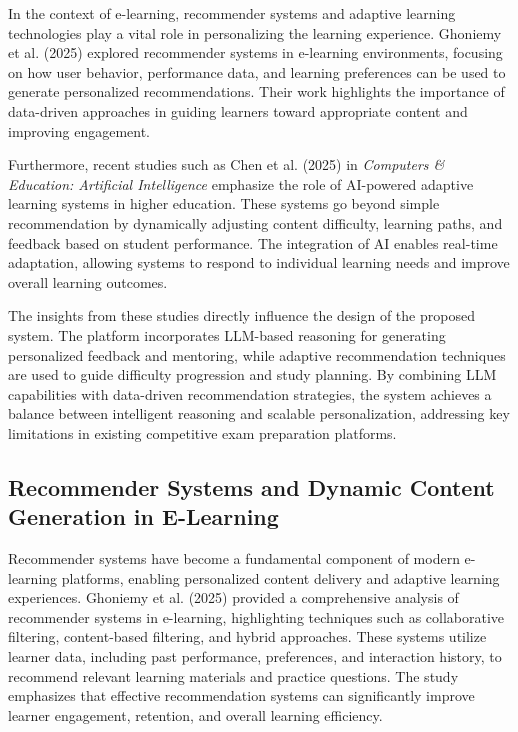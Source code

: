 \begin{sloppypar}
In the context of e-learning, recommender systems and adaptive learning technologies play a vital role in personalizing the learning experience. Ghoniemy et al. (2025) \cite{ghoniemy2025recommender} explored recommender systems in e-learning environments, focusing on how user behavior, performance data, and learning preferences can be used to generate personalized recommendations. Their work highlights the importance of data-driven approaches in guiding learners toward appropriate content and improving engagement.

Furthermore, recent studies such as Chen et al. (2025) \cite{chen2025adaptive} in \textit{Computers \& Education: Artificial Intelligence} emphasize the role of AI-powered adaptive learning systems in higher education. These systems go beyond simple recommendation by dynamically adjusting content difficulty, learning paths, and feedback based on student performance. The integration of AI enables real-time adaptation, allowing systems to respond to individual learning needs and improve overall learning outcomes.

The insights from these studies directly influence the design of the proposed system. The platform incorporates LLM-based reasoning for generating personalized feedback and mentoring, while adaptive recommendation techniques are used to guide difficulty progression and study planning. By combining LLM capabilities with data-driven recommendation strategies, the system achieves a balance between intelligent reasoning and scalable personalization, addressing key limitations in existing competitive exam preparation platforms.

\subsection{Recommender Systems and Dynamic Content Generation in E-Learning}

Recommender systems have become a fundamental component of modern e-learning platforms, enabling personalized content delivery and adaptive learning experiences. Ghoniemy et al. (2025) \cite{ghoniemy2025recommender} provided a comprehensive analysis of recommender systems in e-learning, highlighting techniques such as collaborative filtering, content-based filtering, and hybrid approaches. These systems utilize learner data, including past performance, preferences, and interaction history, to recommend relevant learning materials and practice questions. The study emphasizes that effective recommendation systems can significantly improve learner engagement, retention, and overall learning efficiency.


\end{sloppypar}
